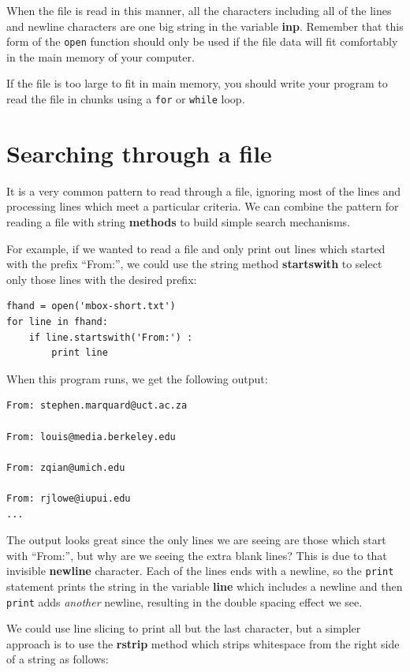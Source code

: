 \documentclass[10pt]{book}
\begin{document}
When the file is read in this manner, all the characters including 
all of the lines and newline characters are one big string 
in the variable {\bf inp}.  
Remember that this form of the {\tt open} function should only be used
if the file data will fit comfortably in the main memory 
of your computer.

If the file is too large to fit in main memory, you should write
your program to read the file in chunks using a {\tt for} or {\tt while}
loop.

\section{Searching through a file}

It is a very common pattern to read through a file, ignoring most
of the lines and processing lines which meet a particular criteria.
We can combine the pattern for reading a file with string {\bf methods}
to build simple search mechanisms.

For example, if we wanted to read a file and only print out lines
which started with the prefix ``From:'', we could use the 
string method {\bf startswith} to select only those lines with
the desired prefix:

\beforeverb
\begin{verbatim}
fhand = open('mbox-short.txt')
for line in fhand:
    if line.startswith('From:') :
        print line
\end{verbatim}
\afterverb
%
When this program runs, we get the following output:

\beforeverb
\begin{verbatim}
From: stephen.marquard@uct.ac.za

From: louis@media.berkeley.edu

From: zqian@umich.edu

From: rjlowe@iupui.edu
...
\end{verbatim}
\afterverb
%
The output looks great since the only lines we are seeing are those 
which start with ``From:'', but why are we seeing the extra blank
lines?  This is due to that invisible {\bf newline} character.
Each of the lines ends with a newline, so the {\tt print} 
statement prints the string in the variable {\bf line} which includes
a newline and then {\tt print} adds {\em another} newline, resulting
in the double spacing effect we see.

We could use line slicing to print all but the last character, but 
a simpler approach is to use the {\bf rstrip} method which strips
whitespace from the right side of a string as follows:
\end{document}
